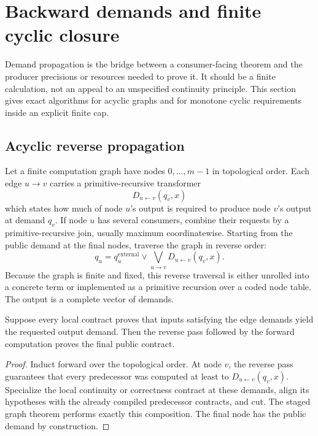 \section{Backward demands and finite cyclic closure}
\label{sec:demand}

Demand propagation is the bridge between a consumer-facing theorem and the producer precisions or resources
needed to prove it.  It should be a finite calculation, not an appeal to an unspecified continuity
principle.  This section gives exact algorithms for acyclic graphs and for monotone cyclic requirements
inside an explicit finite cap.

\subsection{Acyclic reverse propagation}

Let a finite computation graph have nodes \(0,\ldots,m-1\) in topological order.  Each edge
\(u\to v\) carries a primitive-recursive transformer
\[
  D_{u\leftarrow v}(q_v,x)
\]
which states how much of node \(u\)'s output is required to produce node \(v\)'s output at demand \(q_v\).
If node \(u\) has several consumers, combine their requests by a primitive-recursive join, usually maximum
coordinatewise.  Starting from the public demand at the final nodes, traverse the graph in reverse order:
\[
 q_u = q_u^{\mathrm{external}}\vee
       \bigvee_{u\to v}D_{u\leftarrow v}(q_v,x).
\]
Because the graph is finite and fixed, this reverse traversal is either unrolled into a concrete term or
implemented as a primitive recursion over a coded node table.  The output is a complete vector of demands.

\begin{theorem}
Suppose every local contract proves that inputs satisfying the edge demands yield the requested output
demand.  Then the reverse pass followed by the forward computation proves the final public contract.
\end{theorem}
\begin{proof}
Induct forward over the topological order.  At node \(v\), the reverse pass guarantees that every predecessor
was computed at least to \(D_{u\leftarrow v}(q_v,x)\).  Specialize the local continuity or correctness
contract at these demands, align its hypotheses with the already compiled predecessor contracts, and cut.
The staged graph theorem performs exactly this composition.  The final node has the public demand by
construction.
\end{proof}

